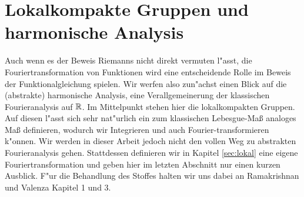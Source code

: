 \section{Lokalkompakte Gruppen und harmonische Analysis}\label{sec:topogroup}
	Auch wenn es der Beweis Riemanns nicht direkt vermuten l"asst, die Fouriertransformation von Funktionen wird eine entscheidende Rolle im Beweis der Funktionalgleichung spielen.
	Wir werfen also zun"achst einen Blick auf die (abstrakte) harmonische Analysis, eine Verallgemeinerung der klassischen Fourieranalysis auf $\mathbb{R}$.
	Im Mittelpunkt stehen hier die lokalkompakten Gruppen.
	Auf diesen l"asst sich sehr nat"urlich ein zum klassischen Lebesgue-Maß analoges Maß definieren, wodurch wir Integrieren und auch Fourier-transformieren k"onnen.
	Wir werden in dieser Arbeit jedoch nicht den vollen Weg zu abstrakten Fourieranalysis gehen.
	Stattdessen definieren wir in Kapitel \ref{sec:lokal} eine eigene Fouriertransformation und geben hier im letzten Abschnitt nur einen kurzen Ausblick.
	F"ur die Behandlung des Stoffes halten wir uns dabei an Ramakrishnan und Valenza \cite{rama} Kapitel 1 und 3.
